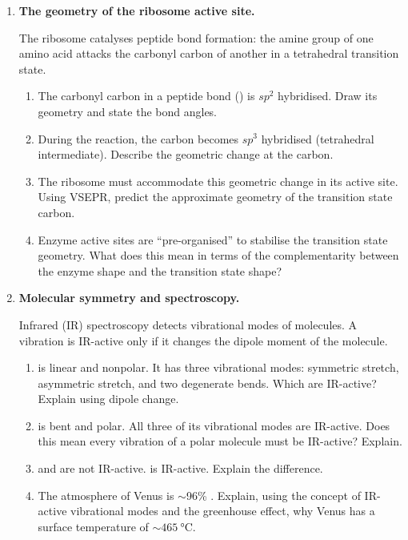 \documentclass[12pt, a4paper]{book}
\begin{document}
\begin{deepbox}
\begin{enumerate}[label=\textbf{D\arabic*.}]

  \item \textbf{The geometry of the ribosome active site.}

    The ribosome catalyses peptide bond formation:
    the amine group of one amino acid attacks the
    carbonyl carbon of another in a tetrahedral transition state.

    \begin{enumerate}[label=(\alph*)]
      \item The carbonyl carbon in a peptide bond ()
            is $sp^2$ hybridised.
            Draw its geometry and state the bond angles.
      \item During the reaction, the carbon becomes
            $sp^3$ hybridised (tetrahedral intermediate).
            Describe the geometric change at the carbon.
      \item The ribosome must accommodate this geometric
            change in its active site.
            Using VSEPR, predict the approximate geometry
            of the transition state carbon.
      \item Enzyme active sites are ``pre-organised'' to
            stabilise the transition state geometry.
            What does this mean in terms of the complementarity
            between the enzyme shape and the transition
            state shape?
    \end{enumerate}

  \item \textbf{Molecular symmetry and spectroscopy.}

    Infrared (IR) spectroscopy detects vibrational modes
    of molecules.
    A vibration is IR-active only if it changes the
    dipole moment of the molecule.

    \begin{enumerate}[label=(\alph*)]
      \item {} is linear and nonpolar.
            It has three vibrational modes: symmetric stretch,
            asymmetric stretch, and two degenerate bends.
            Which are IR-active? Explain using dipole change.
      \item {} is bent and polar.
            All three of its vibrational modes are IR-active.
            Does this mean every vibration of a polar molecule
            must be IR-active? Explain.
      \item {} and  are not IR-active.
             is IR-active.
            Explain the difference.
      \item The atmosphere of Venus is $\sim$96\% .
            Explain, using the concept of IR-active vibrational
            modes and the greenhouse effect, why Venus has
            a surface temperature of $\sim\SI{465}{\degreeCelsius}$.
    \end{enumerate}

\end{enumerate}
\end{deepbox}
\end{document}
